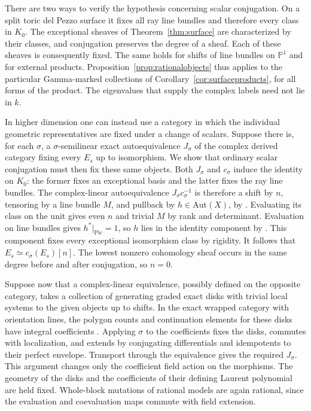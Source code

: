 There are two ways to verify the hypothesis concerning scalar conjugation. On a split toric del Pezzo surface it fixes all ray line bundles and therefore every class in $K_0$. The exceptional sheaves of Theorem~\ref{thm:surface} are characterized by their classes, and conjugation preserves the degree of a sheaf. Each of these sheaves is consequently fixed. The same holds for shifts of line bundles on $\mathbb P^1$ and for external products. Proposition~\ref{prop:rationalobjects} thus applies to the particular Gamma-marked collections of Corollary~\ref{cor:surfaceproducts}, for all forms of the product. The eigenvalues that supply the complex labels need not lie in $k$.

In higher dimension one can instead use a category in which the individual geometric representatives are fixed under a change of scalars. Suppose there is, for each $\sigma$, a $\sigma$-semilinear exact autoequivalence $J_\sigma$ of the complex derived category fixing every $E_s$ up to isomorphism. We show that ordinary scalar conjugation must then fix these same objects. Both $J_\sigma$ and $c_\sigma$ induce the identity on $K_0$: the former fixes an exceptional basis and the latter fixes the ray line bundles. The complex-linear autoequivalence $J_\sigma c_\sigma^{-1}$ is therefore a shift by $n$, tensoring by a line bundle $M$, and pullback by $h\in\mathrm{Aut}(X)$, by \cite[Theorem~3.1]{BO}. Evaluating its class on the unit gives even $n$ and trivial $M$ by rank and determinant. Evaluation on line bundles gives $h^*|_{\mathrm{Pic}}=1$, so $h$ lies in the identity component by \cite[Theorem~4.5]{Dun}. This component fixes every exceptional isomorphism class by rigidity. It follows that $E_s\simeq c_\sigma(E_s)[n]$. The lowest nonzero cohomology sheaf occurs in the same degree before and after conjugation, so $n=0$.

Suppose now that a complex-linear equivalence, possibly defined on the opposite category, takes a collection of generating graded exact disks with trivial local systems to the given objects up to shifts. In the exact wrapped category with orientation lines, the polygon counts and continuation elements for these disks have integral coefficients \cite[\S\S2.2--2.4]{GPS}. Applying $\sigma$ to the coefficients fixes the disks, commutes with localization, and extends by conjugating differentials and idempotents to their perfect envelope. Transport through the equivalence gives the required $J_\sigma$. This argument changes only the coefficient field action on the morphisms. The geometry of the disks and the coefficients of their defining Laurent polynomial are held fixed. Whole-block mutations of rational models are again rational, since the evaluation and coevaluation maps commute with field extension.

